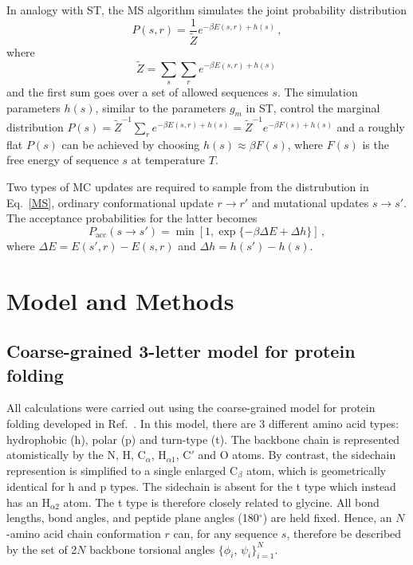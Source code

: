 \documentclass[
aip,
rsi,%
amsmath,amssymb,
reprint,%
]{revtex4-1}
\newcommand	 {\sbar}	{{s}}
\newcommand	 {\rbar}	{{r}}
\begin{document}
In analogy with ST, the MS algorithm simulates the joint probability distribution
\begin{equation}
P(\sbar,\rbar) =\dfrac{1}{\tilde{Z}}e^{-\beta E(\sbar,\rbar) + h(\sbar)}\,, 
\label{MS}
\end{equation}
where  
\begin{equation}
\tilde{Z} = \sum_{\sbar}\sum_{\rbar} e^{-\beta E(\sbar,\rbar)+ h(\sbar)}\,
\end{equation}
and the first sum goes over a set of allowed sequences $\sbar$. The simulation parameters $h(\sbar)$, similar to the parameters $g_m$ in ST, control the marginal distribution $P(\sbar)=\tilde{Z}^{-1}\sum_{\rbar} e^{-\beta E(\sbar,\rbar)+ h(\sbar)} = \tilde{Z}^{-1}e^{-\beta F(\sbar)+ h(\sbar)}$ and a roughly flat $P(\sbar)$ can be achieved by choosing $h(\sbar) \approx \beta F(\sbar)$, where $F(\sbar)$ is the free energy of sequence $\sbar$ at temperature $T$. 

Two types of MC updates are required to sample from the distrubution in Eq.~\ref{MS}, ordinary conformational update $\rbar\rightarrow\rbar'$ and mutational updates $\sbar\rightarrow\sbar'$. The acceptance probabilities for the latter  becomes
\begin{equation}
P_\mathrm{acc} (\sbar\rightarrow\sbar') = \min [1, \exp\{-\beta\Delta E+\Delta h\}]\,,
\label{accrej}
\end{equation}
where $\Delta E = E(\sbar',\rbar)-E(\sbar,\rbar)$ and $\Delta h = h({\sbar'})-h(\sbar)$.

\section{Model and Methods}
\subsection{Coarse-grained 3-letter model for protein folding}
\noindent
All calculations were carried out using the coarse-grained model for protein folding developed in Ref.~. In this model, there are 3 different amino acid types: hydrophobic (h), polar (p) and turn-type (t). The backbone chain is represented atomistically by the N, H, $\mathrm{C}_\alpha$, $\mathrm{H}_{\alpha 1}$, C$'$ and O atoms. By contrast, the sidechain represention is simplified to a single enlarged $\mathrm{C}_\beta$ atom, which is geometrically identical for h and p types. The sidechain is absent for the t type which instead has an $\mathrm{H}_{\alpha 2}$ atom. The t type is therefore closely related to glycine. All bond lengths, bond angles, and peptide plane angles (180$^\circ$) are held fixed. Hence, an $N$-amino acid chain conformation $\rbar$ can, for any sequence $\sbar$, therefore be described by the set of 2$N$ backbone torsional angles $\{\phi_i$, $\psi_i\}_{i=1}^{N}$. 
 
\end{document}
